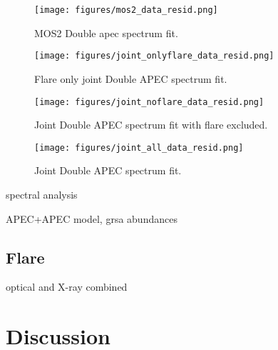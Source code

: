 \documentclass[twocolumn]{aastex631}
\begin{document}
\begin{figure}
    \begin{centering}
        \texttt{[image: figures/mos2\_data\_resid.png]}
        \caption{
         MOS2 Double apec spectrum fit.
        }
        \label{fig:spec_mos2}
    \end{centering}
\end{figure}

\begin{figure}
    \begin{centering}
        \texttt{[image: figures/joint\_onlyflare\_data\_resid.png]}
        \caption{
         Flare only joint Double APEC spectrum fit.
        }
        \label{fig:spec_joint_onlyflare}
    \end{centering}
\end{figure}


\begin{figure}
    \begin{centering}
        \texttt{[image: figures/joint\_noflare\_data\_resid.png]}
        \caption{
         Joint Double APEC spectrum fit with flare excluded.
        }
        \label{fig:spec_joint_noflare}
    \end{centering}
\end{figure}

\begin{figure}
    \begin{centering}
        \texttt{[image: figures/joint\_all\_data\_resid.png]}
        \caption{
         Joint Double APEC spectrum fit.
        }
        \label{fig:spec_joint_all}
    \end{centering}
\end{figure}


spectral analysis

APEC+APEC model, grsa abundances

\subsection{Flare}

optical and X-ray combined

\section{Discussion}
\end{document}
